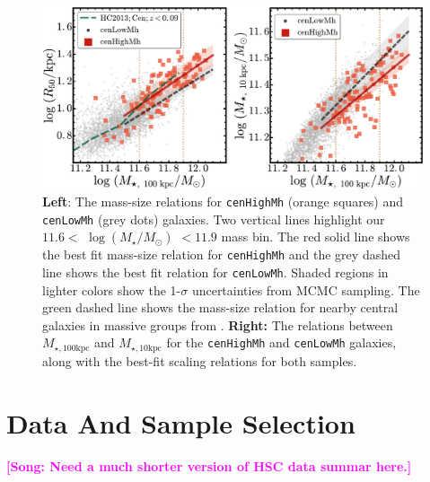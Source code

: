 \documentclass[a4paper,fleqn,usenatbib]{mnras}
\def\redm{\texttt{redMaPPer}}
\def\rbcg{\texttt{cenHighMh}}
\def\nbcg{\texttt{cenLowMh}}
\def\logms{{$\log (M_{\star}/M_{\odot})$}}
\def\minn{{$M_{\star,10\mathrm{kpc}}$}}
\def\mtot{{$M_{\star,100\mathrm{kpc}}$}}
\newcommand{\song}[1]{\textcolor{magenta}{\textbf{[Song: #1]}}}
\newcommand{\alexie}[1]{\textcolor{blue}{\textbf{[Alexie: #1]}}}
\begin{document}
  \begin{figure}
      \centering 
      \includegraphics[width=\textwidth]{fig/redbcg_scaling_relation}
      \caption{
          \textbf{Left}: The mass-size relations for \rbcg{} (orange squares) and 
          \nbcg{} (grey dots) galaxies. 
          Two vertical lines highlight our $11.6<$ \logms{} $<11.9$ mass bin. 
          The red solid line shows the best fit mass-size relation for \rbcg{} and the 
          grey dashed line shows the best fit relation for \nbcg{}. 
          Shaded regions in lighter colors show the 1-$\sigma$ uncertainties
          from MCMC sampling.  
          The green dashed line shows the mass-size relation for nearby central 
          galaxies in massive groups from \citet{HCompany13}. 
          \textbf{Right:} The relations between \mtot{} and \minn{} for the 
          \rbcg{} and \nbcg{} galaxies, along with the best-fit scaling relations for 
          both samples.
          }
      \label{fig:scaling_relation} 
  \end{figure}


\section{Data And Sample Selection}
    \label{sec:data}
    
    \song{Need a much shorter version of HSC data summar here.}
    
    
\end{document}
